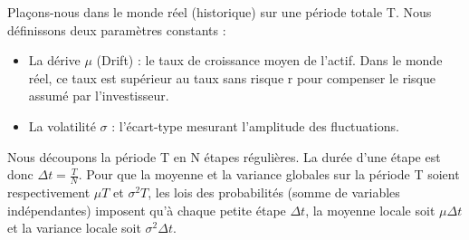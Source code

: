 \begin{definitionbox}
Plaçons-nous dans le monde réel (historique) sur une période totale T. 
Nous définissons deux paramètres constants :
\begin{itemize}[label=$\cdot$]
    \item La dérive $\mu$ (Drift) : le taux de croissance moyen de l'actif. Dans le monde réel, ce taux est supérieur au taux sans risque r pour compenser le risque assumé par l'investisseur.
    \item La volatilité $\sigma$ : l'écart-type mesurant l'amplitude des fluctuations.
\end{itemize}
\end{definitionbox}

Nous découpons la période T en N étapes régulières. La durée d'une étape est donc $\Delta t = \frac{T}{N}$.
Pour que la moyenne et la variance globales sur la période T soient respectivement $\mu T$ et $\sigma^2 T$, les lois des probabilités (somme de variables indépendantes) imposent qu'à chaque petite étape $\Delta t$, la moyenne locale soit $\mu \Delta t$ et la variance locale soit $\sigma^2 \Delta t$.

